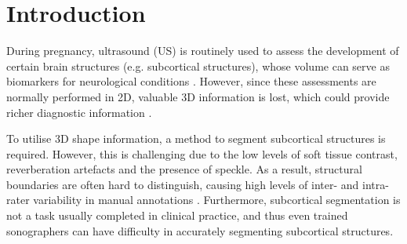 \documentclass[conference]{IEEEtran}
\begin{document}
\section{Introduction}




During pregnancy, ultrasound (US) is routinely used to assess the development of certain brain structures (e.g. subcortical structures), whose volume can serve as biomarkers for neurological conditions \cite{Malinger2020}. However, since these assessments are normally performed in 2D, valuable 3D information is lost, which could provide richer diagnostic information \cite{Hesse2022}.

To utilise 3D shape information, a method to segment subcortical structures is required. However, this is challenging due to the low levels of soft tissue contrast, reverberation artefacts and the presence of speckle. As a result, structural boundaries are often hard to distinguish, causing high levels of inter- and intra-rater variability in manual annotations \cite{Hesse2022}. Furthermore, subcortical segmentation is not a task usually completed in clinical practice, and thus even trained sonographers can have difficulty in accurately segmenting subcortical structures. 
\end{document}
